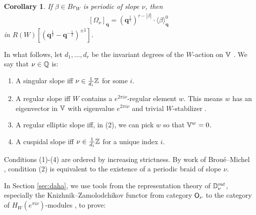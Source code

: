 \documentclass[a4paper,10pt,leqno]{amsart}
\theoremstyle{plain}
\newtheorem{maincor}[mainthm]{Corollary}
\theoremstyle{plain}
\theoremstyle{plain}
\theoremstyle{definition}
\theoremstyle{remark}
\newcommand{\Br}{\mathit{Br}}
\newcommand{\Q}{\bm{q}}
\newcommand{\Tr}[1]{\langle{#1}\rangle_{\Q}}
\newcommand{\rat}{\mathit{rat}}
\newcommand{\slope}{\nu}
\begin{document}
\begin{maincor}\label{cor:periodic}
If $\beta \in \Br_W$ is periodic of slope $\slope$, then
\begin{align}
{[\Omega_\slope]_{\Q}}
=	(\Q^{\frac{1}{2}})^{r - |\beta|} \cdot \Tr{\beta}^0
\end{align}
in $R(W)[(\Q^{\frac{1}{2}} - \Q^{-\frac{1}{2}})^{\pm 1}]$.
\end{maincor}

In what follows, let $d_1, \ldots, d_r$ be the invariant degrees of the $W$-action on $\mathbb{V}$ \cite[149]{gp}.
We say that $\slope \in \bb{Q}$ is:
\begin{enumerate}
\item 	A singular slope iff $\slope \in \frac{1}{d_i}\bb{Z}$ for some $i$.
\item 	A regular slope iff $W$ contains a $e^{2\pi i\slope}$-regular element $w$.
		This means $w$ has an eigenvector in $\mathbb{V}$ with eigenvalue $e^{2\pi i\slope}$ and trivial $W$-stabilizer \cite{springer_1974}.
\item 	A regular elliptic slope iff, in (2), we can pick $w$ so that $\mathbb{V}^w = 0$.
\item 	A cuspidal slope iff $\slope \in \frac{1}{d_i}\bb{Z}$ for a unique index $i$.
\end{enumerate}
Conditions (1)-(4) are ordered by increasing strictness.
By work of Brou\'e--Michel \cite{bm_1997}, condition (2) is equivalent to the existence of a periodic braid of slope $\slope$.

In Section \ref{sec:daha}, we use tools from the representation theory of $\bb{D}_\slope^\rat$, especially the Knizhnik--Zamolodchikov functor from category $\sf{O}_\slope$ to the category of $H_W(e^{\pi i\slope})$-modules \cite{ggor}, to prove:
\end{document}
